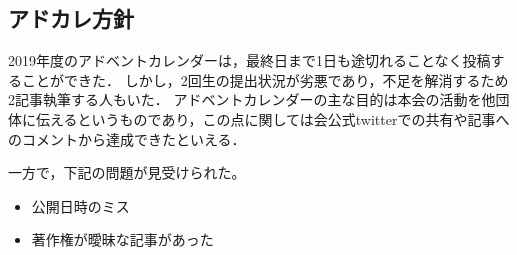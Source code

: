 \subsection*{アドカレ方針}


2019年度のアドベントカレンダーは，最終日まで1日も途切れることなく投稿することができた．
しかし，2回生の提出状況が劣悪であり，不足を解消するため2記事執筆する人もいた．
アドベントカレンダーの主な目的は本会の活動を他団体に伝えるというものであり，この点に関しては会公式twitterでの共有や記事へのコメントから達成できたといえる．

一方で，下記の問題が見受けられた。
\begin{itemize}
\item 公開日時のミス
\item 著作権が曖昧な記事があった
\end{itemize}


